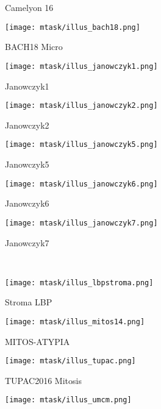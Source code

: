 \begin{figure*}
\begin{subfigure}[t]{0.115\textwidth}
        \caption{Camelyon 16}
    \end{subfigure}
    \begin{subfigure}[t]{0.115\textwidth}
        \centering
        \texttt{[image: mtask/illus\_bach18.png]}
        \caption{BACH18 Micro}
    \end{subfigure}
    \begin{subfigure}[t]{0.115\textwidth}
        \centering
        \texttt{[image: mtask/illus\_janowczyk1.png]}
        \caption{Janowczyk1}
    \end{subfigure}
    \begin{subfigure}[t]{0.115\textwidth}
        \centering
        \texttt{[image: mtask/illus\_janowczyk2.png]}
        \caption{Janowczyk2}
    \end{subfigure}
    \begin{subfigure}[t]{0.115\textwidth}
        \centering
        \texttt{[image: mtask/illus\_janowczyk5.png]}
        \caption{Janowczyk5}
    \end{subfigure}
    \begin{subfigure}[t]{0.115\textwidth}
        \centering
        \texttt{[image: mtask/illus\_janowczyk6.png]}
        \caption{Janowczyk6}
    \end{subfigure}
    \begin{subfigure}[t]{0.115\textwidth}
        \centering
        \texttt{[image: mtask/illus\_janowczyk7.png]}
        \caption{Janowczyk7}
    \end{subfigure} \\
    \begin{subfigure}[t]{0.115\textwidth}
        \centering
        \texttt{[image: mtask/illus\_lbpstroma.png]}
        \caption{Stroma LBP}
    \end{subfigure}
    \begin{subfigure}[t]{0.115\textwidth}
        \centering
        \texttt{[image: mtask/illus\_mitos14.png]}
        \caption{MITOS-ATYPIA}
    \end{subfigure}
    \begin{subfigure}[t]{0.115\textwidth}
        \centering
        \texttt{[image: mtask/illus\_tupac.png]}
        \caption{TUPAC2016 Mitosis}
    \end{subfigure}
    \begin{subfigure}[t]{0.115\textwidth}
        \centering
        \texttt{[image: mtask/illus\_umcm.png]}

\end{subfigure}
\end{figure*}
